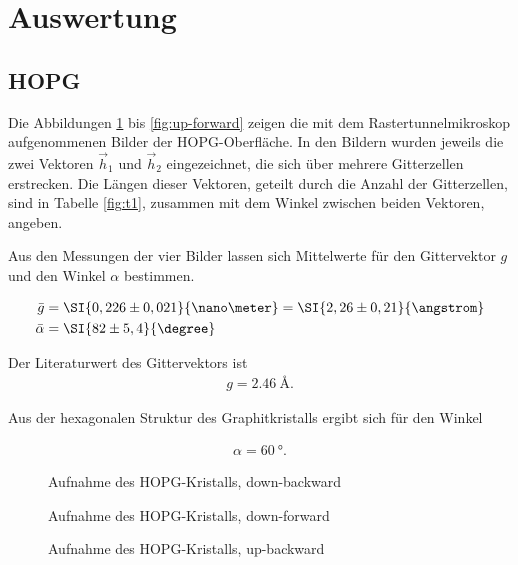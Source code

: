 \section{Auswertung}
\subsection{HOPG}

Die Abbildungen \ref{fig:down-backward} bis \ref{fig:up-forward} zeigen die mit dem Rastertunnelmikroskop aufgenommenen Bilder der HOPG-Oberfläche.
In den Bildern wurden jeweils die zwei Vektoren $\vec{h}_1$ und $\vec{h}_2$ eingezeichnet, die sich über mehrere Gitterzellen erstrecken.
Die Längen dieser Vektoren, geteilt durch die Anzahl der Gitterzellen, sind in Tabelle \ref{fig:t1}, zusammen mit dem Winkel zwischen beiden Vektoren, angeben.

Aus den Messungen der vier Bilder lassen sich Mittelwerte für den Gittervektor $g$ und den Winkel $\alpha$ bestimmen.

\begin{align}
	\bar{g} &= \SI{0,226 \pm 0,021}{\nano \meter} = \SI{2,26 \pm 0,21}{\angstrom}\\
	\bar{\alpha} &= \SI{82 \pm 5,4}{\degree}
\end{align}

Der Literaturwert\cite{hopg} des Gittervektors ist
\begin{align}
	g = \SI{2.46}{\angstrom}.
\end{align}

Aus der hexagonalen Struktur des Graphitkristalls ergibt sich für den Winkel

\begin{align}
	\alpha = \SI{60}{\degree}.
\end{align}

\begin{figure}
	\centering
	\resizebox{12cm}{!}{
		
	}
	\caption{Aufnahme des HOPG-Kristalls, down-backward}
	\label{fig:down-backward}
\end{figure}

\begin{figure}
	\centering
	\resizebox{12cm}{!}{
		
	}
	\caption{Aufnahme des HOPG-Kristalls, down-forward}
	\label{fig:down-forward}
\end{figure}

\begin{figure}
	\centering
	\resizebox{12cm}{!}{
		
	}
	\caption{Aufnahme des HOPG-Kristalls, up-backward}
	\label{fig:up-backward}
\end{figure}

